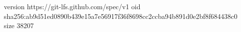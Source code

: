 version https://git-lfs.github.com/spec/v1
oid sha256:ab9d51ed0890b439e15a7e56917f36f8698cc2ccba94b891d0e2bf8f684438c0
size 38207
